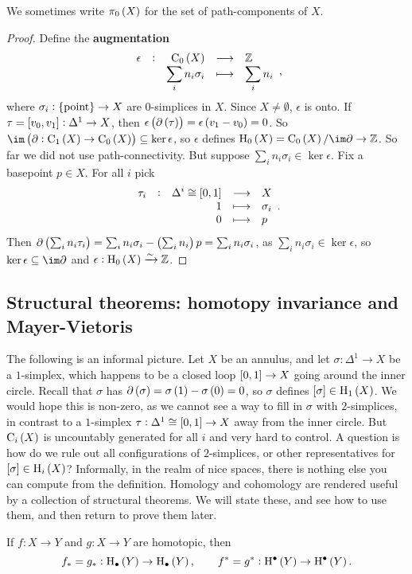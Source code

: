 We sometimes write $ \pi_0\br{X} $ for the set of path-components of $ X $.

\begin{proof}
Define the \textbf{augmentation}
$$ \function[\epsilon]{\C_0\br{X}}{\ZZ}{\sum_i n_i\sigma_i}{\sum_i n_i}, $$
where $ \sigma_i : \pt \to X $ are $ 0 $-simplices in $ X $. Since $ X \ne \emptyset $, $ \epsilon $ is onto. If $ \tau = \sbr{v_0, v_1} : \Delta^1 \to X $, then $ \epsilon\br{\da\br{\tau}} = \epsilon\br{v_1 - v_0} = 0 $. So $ \im \br{\da : \C_1\br{X} \to \C_0\br{X}} \subseteq \ker \epsilon $, so $ \epsilon $ defines $ \H_0\br{X} = \C_0\br{X} / \im \da \to \ZZ $. So far we did not use path-connectivity. But suppose $ \sum_i n_i\sigma_i \in \ker \epsilon $. Fix a basepoint $ p \in X $. For all $ i $ pick
$$ \functions[\tau_i]{\Delta^i \cong \sbr{0, 1}}{X}{1}{\sigma_i}{0}{p}. $$
Then $ \da\br{\sum_i n_i\tau_i} = \sum_i n_i\sigma_i - \br{\sum_i n_i}p = \sum_i n_i\sigma_i $, as $ \sum_i n_i\sigma_i \in \ker \epsilon $, so $ \ker \epsilon \subseteq \im \da $ and $ \epsilon : \H_0\br{X} \xrightarrow{\sim} \ZZ $.
\end{proof}

\pagebreak

\subsection{Structural theorems: homotopy invariance and Mayer-Vietoris}

The following is an informal picture. Let $ X $ be an annulus, and let $ \sigma : \Delta^1 \to X $ be a $ 1 $-simplex, which happens to be a closed loop $ \sbr{0, 1} \to X $ going around the inner circle. Recall that $ \sigma $ has $ \da\br{\sigma} = \sigma\br{1} - \sigma\br{0} = 0 $, so $ \sigma $ defines $ \sbr{\sigma} \in \H_1\br{X} $. We would hope this is non-zero, as we cannot see a way to fill in $ \sigma $ with $ 2 $-simplices, in contrast to a $ 1 $-simplex $ \tau : \Delta^1 \cong \sbr{0, 1} \to X $ away from the inner circle. But $ \C_i\br{X} $ is uncountably generated for all $ i $ and very hard to control. A question is how do we rule out all configurations of $ 2 $-simplices, or other representatives for $ \sbr{\sigma} \in \H_i\br{X} $? Informally, in the realm of nice spaces, there is nothing else you can compute from the definition. Homology and cohomology are rendered useful by a collection of structural theorems. We will state these, and see how to use them, and then return to prove them later.

\begin{theorem}
If $ f : X \to Y $ and $ g : X \to Y $ are homotopic, then
$$ f_* = g_* : \H_\bullet\br{Y} \to \H_\bullet\br{Y}, \qquad f^* = g^* : \H^\bullet\br{Y} \to \H^\bullet\br{Y}. $$
\end{theorem}

